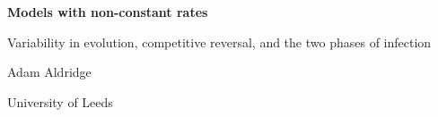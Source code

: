 \documentclass[11pt,a4paper]{report}
\begin{document}
\hypersetup{pageanchor=false}
\begin{titlepage}
\centering
\vspace*{4cm}
{\LARGE\bfseries Models with non-constant rates\par}
\vspace{6pt}
{\large Variability in evolution, competitive reversal, and the two phases of
infection\par}
\vspace{2.5cm}
{\large Adam Aldridge\par}
\vspace{4pt}
{University of Leeds\par}
\end{titlepage}
\hypersetup{pageanchor=true}

\tableofcontents
\clearpage



\FloatBarrier
\begingroup
\footnotesize
\makeatletter
\renewcommand\@openbib@code{\setlength{\itemsep}{0pt}\setlength{\parsep}{0pt}}
\makeatother


\endgroup
\end{document}
